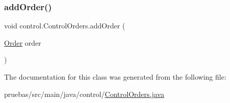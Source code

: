 \subsubsection{\texorpdfstring{add\+Order()}{addOrder()}}
{\footnotesize\ttfamily void control.\+Control\+Orders.\+add\+Order (\begin{DoxyParamCaption}\item[{\mbox{\hyperlink{classclases_1_1_order}{Order}}}]{order }\end{DoxyParamCaption})}



The documentation for this class was generated from the following file\+:\begin{DoxyCompactItemize}
\item 
pruebas/src/main/java/control/\mbox{\hyperlink{_control_orders_8java}{Control\+Orders.\+java}}\end{DoxyCompactItemize}
